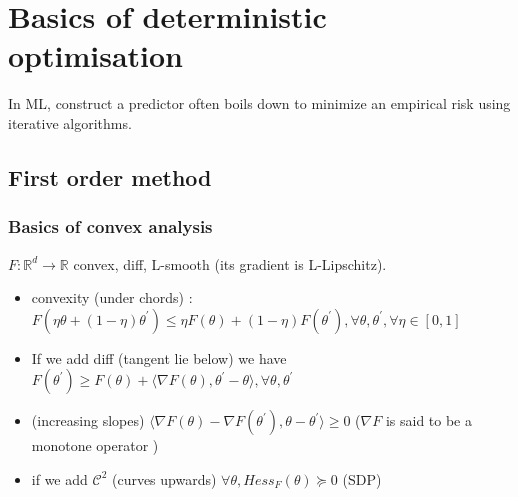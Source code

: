 \chapter{Basics of deterministic optimisation}

In ML, construct a predictor often boils down to minimize an empirical risk using iterative algorithms.

\section{First order method}

\subsection{Basics of convex analysis}
$ F: \mathbb{R}^d \to \mathbb{R} $ convex, diff, L-smooth (its gradient is L-Lipschitz). 
\begin{itemize}
    \item convexity (under chords) : $ F(\eta \theta + (1 - \eta ) \theta ^\prime ) \leq  \eta F(\theta ) + (1 - \eta ) F(\theta ^\prime ), \forall \theta , \theta ^\prime , \forall \eta  \in 
    [0, 1] $ 
    \item If we add diff (tangent lie below) we have $ F(\theta ^\prime ) \geq F(\theta ) + \langle  \nabla F(\theta ) , \theta ^\prime - \theta  \rangle ,  \forall \theta , \theta ^\prime $ 
    \item (increasing slopes) $ \langle \nabla F(\theta ) - \nabla F(\theta ^\prime ), \theta - \theta ^\prime \rangle \geq 0 $ ($ \nabla F $ is said to be a monotone operator )
    \item if we add $ \mathcal{C}^2 $ (curves upwards) $ \forall \theta , Hess_F (\theta ) \succeq 0 $ (SDP)
\end{itemize}

